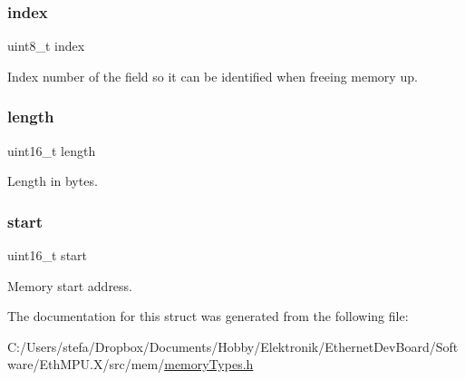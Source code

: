 \subsubsection{\texorpdfstring{index}{index}}
{\footnotesize\ttfamily uint8\+\_\+t index}



Index number of the field so it can be identified when freeing memory up. 

\mbox{\label{structmemory_field__t_a1892eba2086d12ac2b09005aeb09ea3b}} 
\subsubsection{\texorpdfstring{length}{length}}
{\footnotesize\ttfamily uint16\+\_\+t length}



Length in bytes. 

\mbox{\label{structmemory_field__t_a171a2b5d11b1a5891c38a98ac731a161}} 
\subsubsection{\texorpdfstring{start}{start}}
{\footnotesize\ttfamily uint16\+\_\+t start}



Memory start address. 



The documentation for this struct was generated from the following file\+:\begin{DoxyCompactItemize}
\item 
C\+:/\+Users/stefa/\+Dropbox/\+Documents/\+Hobby/\+Elektronik/\+Ethernet\+Dev\+Board/\+Software/\+Eth\+M\+P\+U.\+X/src/mem/\mbox{\hyperlink{memory_types_8h}{memory\+Types.\+h}}\end{DoxyCompactItemize}
